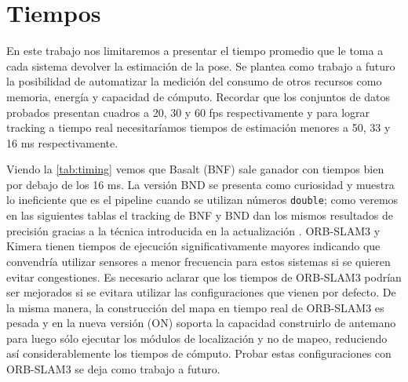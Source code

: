 \documentclass[ twoside,openright,titlepage,numbers=noenddot,%
                headinclude,footinclude,cleardoublepage=empty,abstract=on,
                BCOR=-5mm,paper=a4,fontsize=11pt
                ]{scrreprt}
\newcommand{\passthrough}[1]{#1}
\begin{document}
\hypertarget{tiempos}{%
\section{Tiempos}\label{tiempos}}

En este trabajo nos limitaremos a presentar el tiempo promedio que le
toma a cada sistema devolver la estimación de la pose. Se plantea como
trabajo a futuro la posibilidad de automatizar la medición del consumo
de otros recursos como memoria, energía y capacidad de cómputo. Recordar
que los conjuntos de datos probados presentan cuadros a 20, 30 y 60 fps
respectivamente y para lograr tracking a tiempo real necesitaríamos
tiempos de estimación menores a 50, 33 y 16 ms respectivamente.

Viendo la \autoref{tab:timing} vemos que Basalt (BNF) sale ganador con
tiempos bien por debajo de los 16 ms. La versión BND se presenta como
curiosidad y muestra lo ineficiente que es el pipeline cuando se
utilizan números \passthrough{\lstinline!double!}; como veremos en las
siguientes tablas el tracking de BNF y BND dan los mismos resultados de
precisión gracias a la técnica introducida en la actualización
\autocite{demmelBasaltSquareRoot2021}. ORB-SLAM3 y Kimera tienen tiempos
de ejecución significativamente mayores indicando que convendría
utilizar sensores a menor frecuencia para estos sistemas si se quieren
evitar congestiones. Es necesario aclarar que los tiempos de ORB-SLAM3
podrían ser mejorados si se evitara utilizar las configuraciones que
vienen por defecto. De la misma manera, la construcción del mapa en
tiempo real de ORB-SLAM3 es pesada y en la nueva versión (ON) soporta la
capacidad construirlo de antemano para luego sólo ejecutar los módulos
de localización y no de mapeo, reduciendo así considerablemente los
tiempos de cómputo. Probar estas configuraciones con ORB-SLAM3 se deja
como trabajo a futuro.
\end{document}
